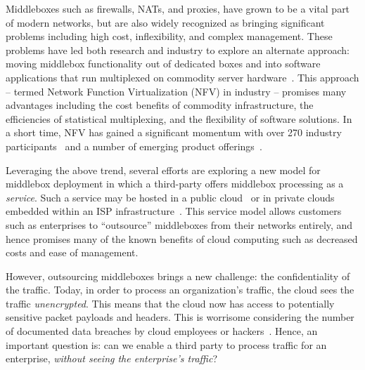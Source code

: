 %
%
%




Middleboxes such as firewalls, NATs, and proxies, have grown to be a vital part of modern networks, but are 
also widely recognized as bringing significant problems including high cost, inflexibility, and complex management.  
These problems have led both research and industry to explore an alternate approach: moving middlebox functionality out of dedicated boxes and into 
software applications that run multiplexed on commodity server hardware~\cite{mb-manifesto,comb,aplomb,opennf,clickos,flowtags,etsi-nfv,domain20,opnfv}.
This approach -- termed Network Function Virtualization (NFV) in industry -- promises many advantages including the cost benefits of commodity infrastructure, 
the efficiencies of statistical multiplexing, and the flexibility of software solutions. 
In a short time, NFV has gained a significant momentum with over 270 industry participants~\cite{etsi-nfv} and a number of emerging product offerings~\cite{brocade,dell,juniper}.

Leveraging the above trend, several efforts are exploring a new model for middlebox deployment in which a third-party offers middlebox processing as a  
\emph{service}.
Such a service may be hosted in a public cloud~\cite{aplomb,zscaler,aryaka} or in private clouds embedded within an ISP 
infrastructure~\cite{domain20, telefonica}.  
This service model allows customers such as enterprises to ``outsource'' middleboxes from their networks entirely, and hence promises many of the known benefits of cloud computing  such as decreased costs and ease of management.%

However, outsourcing middleboxes brings a new challenge: the confidentiality of the traffic. 
Today, in order to process an organization's traffic, the cloud sees the traffic {\em unencrypted}.  This means that the cloud 
now has access to potentially sensitive packet payloads and headers. This is 
worrisome considering the number of documented data breaches by cloud employees or hackers~\cite{PrivacyRecords,databreach}.
Hence, an important question is: can we enable a third party to process traffic for an enterprise, {\em without seeing the enterprise's traffic}?

